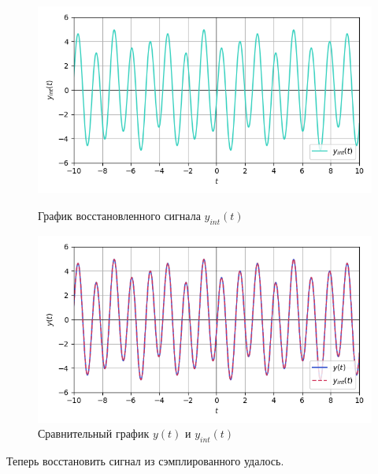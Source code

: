 \documentclass[a4paper]{article}
\begin{document}
\begin{figure}[H]
    \begin{minipage}{0.49\textwidth}
        \centering \includegraphics[width=\textwidth]{sources/second/sins dt=0.25 B=2/4_y_interp.png}
        \caption{График восстановленного сигнала $y_{int}(t)$}
    \end{minipage}\hfill
    \begin{minipage}{0.49\textwidth}
        \centering \includegraphics[width=\textwidth]{sources/second/sins dt=0.25 B=2/5_y_cmp(interpolation).png}
        \caption{Сравнительный график $y(t)$ и $y_{int}(t)$}
    \end{minipage}
\end{figure}
Теперь восстановить сигнал из сэмплированного удалось.
\end{document}
